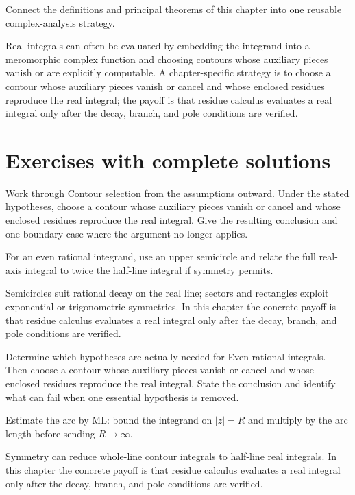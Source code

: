 \begin{problem}\label{prob:iv11-problem-12}
Connect the definitions and principal theorems of this chapter into one reusable complex-analysis strategy.
\end{problem}
\begin{solution}
Real integrals can often be evaluated by embedding the integrand into a meromorphic complex function and choosing contours whose auxiliary pieces vanish or are explicitly computable. A chapter-specific strategy is to choose a contour whose auxiliary pieces vanish or cancel and whose enclosed residues reproduce the real integral; the payoff is that residue calculus evaluates a real integral only after the decay, branch, and pole conditions are verified.
\end{solution}

\section{Exercises with complete solutions}

\begin{exercise}\label{exr:iv11-01}
Work through Contour selection from the assumptions outward. Under the stated hypotheses, choose a contour whose auxiliary pieces vanish or cancel and whose enclosed residues reproduce the real integral. Give the resulting conclusion and one boundary case where the argument no longer applies.
\end{exercise}
\begin{hint}
For an even rational integrand, use an upper semicircle and relate the full real-axis integral to twice the half-line integral if symmetry permits.
\end{hint}
\begin{solution}
Semicircles suit rational decay on the real line; sectors and rectangles exploit exponential or trigonometric symmetries. In this chapter the concrete payoff is that residue calculus evaluates a real integral only after the decay, branch, and pole conditions are verified.
\end{solution}

\begin{exercise}\label{exr:iv11-02}
Determine which hypotheses are actually needed for Even rational integrals. Then choose a contour whose auxiliary pieces vanish or cancel and whose enclosed residues reproduce the real integral. State the conclusion and identify what can fail when one essential hypothesis is removed.
\end{exercise}
\begin{hint}
Estimate the arc by ML: bound the integrand on \(|z|=R\) and multiply by the arc length before sending \(R\to\infty\).
\end{hint}
\begin{solution}
Symmetry can reduce whole-line contour integrals to half-line real integrals. In this chapter the concrete payoff is that residue calculus evaluates a real integral only after the decay, branch, and pole conditions are verified.
\end{solution}

